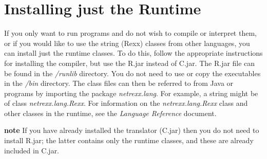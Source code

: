 \section{Installing just the \nr{} Runtime}
If you only want to run \nr{} programs and do not wish to compile or
interpret them, or if you would like to use the \nr{} string (Rexx)
classes from other languages, you can install just the \nr{} runtime
classes.
\newline
To do this, follow the appropriate instructions for installing the
compiler, but use the \nr{}R.jar instead of \nr{}C.jar.
The \nr{}R.jar file can be found in the \emph{\nr{}/runlib} directory.
\newline
You do not need to use or copy the executables in the \emph{\nr{}/bin}
directory.
\newline
The \nr{} class files can then be referred to from Java or \nr{}
programs by importing the package \emph{netrexx.lang}.  For
example, a string might be of class \emph{netrexx.lang.Rexx}.
\newline
For information on the \emph{netrexx.lang.Rexx} class and other classes
in the runtime, see the \emph{\nr{} Language Reference} document.

\textbf{note} If you have already installed the \nr{} translator
(\nr{}C.jar) then you do not need to install \nr{}R.jar; the latter
contains only the \nr{} runtime classes, and these are already
included in \nr{}C.jar.

